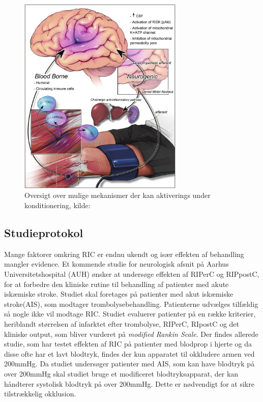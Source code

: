 \begin{figure}[H]
	\centering
	\includegraphics[width = 0.7\textwidth]{billeder/konditioneringsmekanismer.png}
	\caption{Oversigt over mulige mekanismer der kan aktiverings under konditionering, kilde: \cite{RefWorks:3}} \label{fig:mechanism}
\end{figure}

\subsection{Studieprotokol}
Mange faktorer omkring RIC er endnu ukendt og især effekten af behandling mangler evidence. Et kommende studie for neurologisk afsnit på Aarhus Universitetshospital (AUH) ønsker at undersøge effekten af RIPerC og RIPpostC, for at forbedre den kliniske rutine til behandling af patienter med akute iskæmiske stroke.  Studiet skal foretages på patienter med akut iskæmiske stroke(AIS), som modtager trombolysebehandling. Patienterne udvælges tilfældig så nogle ikke vil modtage RIC. Studiet evaluerer patienter på en række kriterier, heriblandt størrelsen af infarktet efter trombolyse, RIPerC, RIpostC og det kliniske output, som bliver vurderet på \textit{modified Rankin Scale}. Der findes allerede studie, som har testet effekten af RIC på patienter med blodprop i hjerte og da disse ofte har et lavt blodtryk, findes der kun apparatet til okkludere armen ved 200mmHg. Da studiet undersøger patienter med AIS, som kan have blodtryk på over 200mmHg skal studiet bruge et modificeret blodtryksapparat, der kan håndterer systolisk blodtryk på over 200mmHg. Dette er nødvendigt for at sikre tilstrækkelig okklusion.


